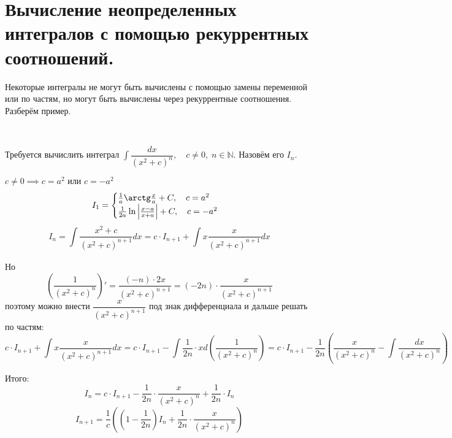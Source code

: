 \documentclass[../main.tex]{subfiles}
\begin{document}
\newpage
\section{Вычисление неопределенных интегралов с помощью рекуррентных соотношений.}
Некоторые интегралы не могут быть вычислены с помощью замены переменной или по частям, но могут быть вычислены через рекуррентные соотношения. 
Разберём пример. 
\begin{example}
    
    \hypertarget{ex:int_recur}{~}

    Требуется вычислить интеграл \( \displaystyle\int\limits_{ }^{ } \dfrac{ dx}{ \left( x^2+c\right)^n},\quad c \neq 0,\; n \in \mathbb{N} \). Назовём его \( I_n\).

    \( c \neq 0 \implies c=a^2\text{ или }c=-a^2\)
    \begin{equation*}
        I_1=
        \begin{cases}
            \frac{ 1}{ a} \arctg \frac{ x}{ a} +C,\quad c=a^2\\
            \frac{ 1}{ 2a} \ln \left| \frac{ x-a}{ x+a} \right|+C,\quad c=-a^2
        \end{cases}
    \end{equation*}
    \[ I_n= \displaystyle\int\limits_{ }^{ } \dfrac{ x^2+c}{ \left( x^2+c\right)^{n+1}} dx=c \cdot I_{n+1}+ \displaystyle\int\limits_{ }^{ } x \dfrac{ x}{ \left( x^2+c\right)^{n+1}} dx\]

    Но 
    \[ \left(\dfrac{ 1}{ \left( x^2+c\right)^{n}}\right)'= \dfrac{ (-n)\cdot2x}{ \left( x^2+c\right)^{n+1}}=\left( -2n\right) \cdot  \dfrac{ x}{ \left( x^2+c\right)^{n+1}}\]
    поэтому можно внести \( \dfrac{ x}{ \left( x^2+c\right)^{n+1}}\) под знак дифференциала и дальше решать по частям:
    \[ c \cdot I_{n+1}+ \displaystyle\int\limits_{ }^{ } x \dfrac{ x}{ \left( x^2+c\right)^{n+1}} dx=c \cdot I_{n+1}- \displaystyle\int\limits_{ }^{ } \dfrac{ 1}{ 2n} \cdot xd\left( \dfrac{ 1}{ \left( x^2+c\right)^{n}} \right) =c \cdot I_{n+1}- \dfrac{ 1}{ 2n} \left( \dfrac{ x}{ \left( x^2+c\right)^n} - \displaystyle\int\limits_{ }^{ } \dfrac{ dx}{ \left( x^2+c\right)^n} \right)\]

    Итого:
    \[ I_n=c \cdot I_{n+1}- \dfrac{ 1}{ 2n} \cdot \dfrac{ x}{ \left( x^2+c\right)^n} + \dfrac{ 1}{ 2n} \cdot I_n\]
    \[ \boxed{I_{n+1}= \dfrac{ 1}{ c} \left( \left( 1- \dfrac{ 1}{ 2n} \right)I_n + \dfrac{ 1}{ 2n} \cdot \dfrac{ x}{ \left( x^2+c\right)^n} \right)}\]
\end{example}
\end{document}
